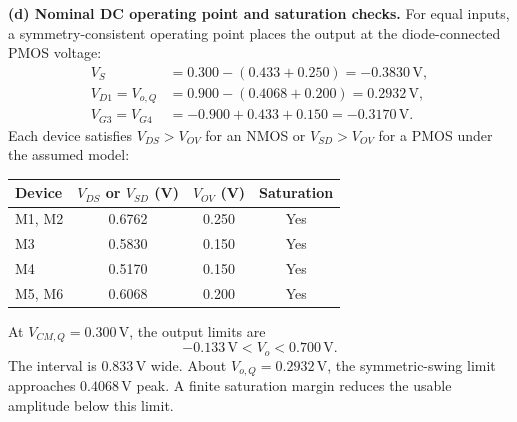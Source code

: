 \documentclass[12pt,letterpaper]{article}
\newcommand{\V}{\,\mathrm{V}}
\begin{document}
\begin{enumerate}
\newpage
\textbf{(d) Nominal DC operating point and saturation checks.}
For equal inputs, a symmetry-consistent operating point places the
output at the diode-connected PMOS voltage:
\begin{align*}
V_S&=0.300-(0.433+0.250)=-0.3830\V,\\
V_{D1}=V_{o,Q}&=0.900-(0.4068+0.200)=0.2932\V,\\
V_{G3}=V_{G4}&=-0.900+0.433+0.150=-0.3170\V.
\end{align*}
Each device satisfies $V_{DS}>V_{OV}$ for an NMOS or
$V_{SD}>V_{OV}$ for a PMOS under the assumed model:
\begin{center}
\small
\begin{tabular}{@{}lccc@{}}
\toprule
Device & $V_{DS}$ or $V_{SD}$ (V) & $V_{OV}$ (V) & Saturation\\
\midrule
M1, M2 & 0.6762 & 0.250 & Yes\\
M3 & 0.5830 & 0.150 & Yes\\
M4 & 0.5170 & 0.150 & Yes\\
M5, M6 & 0.6068 & 0.200 & Yes\\
\bottomrule
\end{tabular}
\end{center}
At $V_{CM,Q}=0.300\V$, the output limits are
\[
-0.133\V<V_o<0.700\V.
\]
The interval is $0.833\V$ wide. About $V_{o,Q}=0.2932\V$,
the symmetric-swing limit approaches $0.4068\V$ peak. A finite
saturation margin reduces the usable amplitude below this limit.


\end{enumerate}
\end{document}

